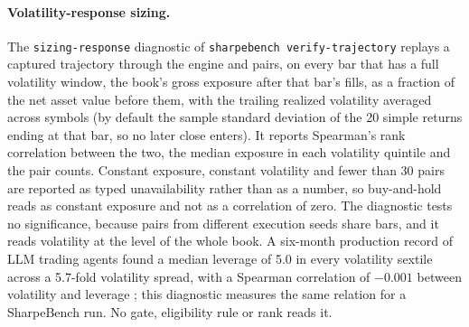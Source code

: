 \paragraph{Volatility-response sizing.} The \texttt{sizing-response} diagnostic of \texttt{sharpebench verify-trajectory} replays a captured trajectory through the engine and pairs, on every bar that has a full volatility window, the book's gross exposure after that bar's fills, as a fraction of the net asset value before them, with the trailing realized volatility averaged across symbols (by default the sample standard deviation of the 20 simple returns ending at that bar, so no later close enters). It reports Spearman's rank correlation between the two, the median exposure in each volatility quintile and the pair counts. Constant exposure, constant volatility and fewer than 30 pairs are reported as typed unavailability rather than as a number, so buy-and-hold reads as constant exposure and not as a correlation of zero. The diagnostic tests no significance, because pairs from different execution seeds share bars, and it reads volatility at the level of the whole book. A six-month production record of LLM trading agents found a median leverage of 5.0 in every volatility sextile across a 5.7-fold volatility spread, with a Spearman correlation of $-0.001$ between volatility and leverage \citep[p.~7]{barton2026production}; this diagnostic measures the same relation for a SharpeBench run. No gate, eligibility rule or rank reads it.

